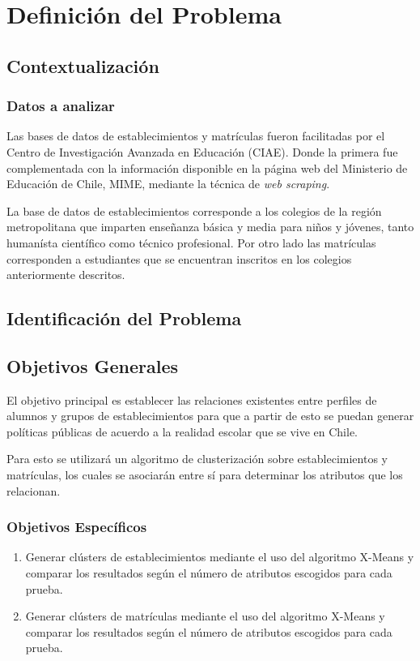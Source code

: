 \chapter{Definici\'on del Problema}

\section{Contextualización}

\subsection{Datos a analizar}

Las bases de datos de establecimientos y matrículas fueron facilitadas por el Centro de Investigación Avanzada en Educación (CIAE). Donde la primera fue complementada con la información disponible en la página web del Ministerio de Educación de Chile, MIME, mediante la técnica de \textit{web scraping}.

La base de datos de establecimientos corresponde a los colegios de la región metropolitana que imparten enseñanza básica y media para niños y jóvenes, tanto humanísta científico como técnico profesional. Por otro lado las matrículas corresponden a estudiantes que se encuentran inscritos en los colegios anteriormente descritos. 

\section{Identificación del Problema}

\section{Objetivos Generales}

El objetivo principal es establecer las relaciones existentes entre perfiles de alumnos y grupos de establecimientos para que a partir de esto se puedan generar políticas públicas de acuerdo a la realidad escolar que se vive en Chile.

Para esto se utilizará un algoritmo de clusterización sobre establecimientos y matrículas, los cuales se asociarán entre sí para determinar los atributos que los relacionan.

\subsection{Objetivos Específicos}
\begin{enumerate}
\item Generar clústers de establecimientos mediante el uso del algoritmo X-Means y comparar los resultados según el número de atributos escogidos para cada prueba.
\item Generar clústers de matrículas mediante el uso del algoritmo X-Means y comparar los resultados según el número de atributos escogidos para cada prueba.
\end{enumerate}